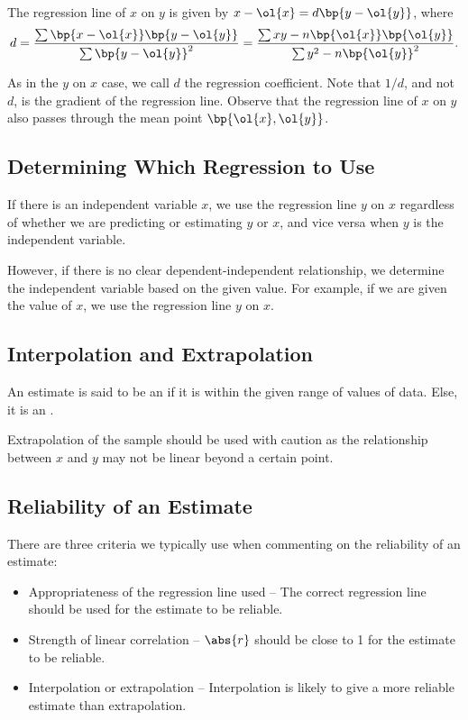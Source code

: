 \begin{problem}
    The regression line of $x$ on $y$ is given by $x - \ol{x} = d\bp{y - \ol{y}}$, where \[d = \frac{\sum \bp{x - \ol{x}} \bp{y - \ol{y}}}{\sum \bp{y - \ol{y}}^2} = \frac{\sum xy - n \bp{\ol{x}}\bp{\ol{y}}}{\sum y^2 - n \bp{\ol{y}}^2}.\]
\end{problem}

As in the $y$ on $x$ case, we call $d$ the regression coefficient. Note that $1/d$, and not $d$, is the gradient of the regression line. Observe that the regression line of $x$ on $y$ also passes through the mean point $\bp{\ol{x}, \ol{y}}$.

\subsection{Determining Which Regression to Use}

If there is an independent variable $x$, we use the regression line $y$ on $x$ regardless of whether we are predicting or estimating $y$ or $x$, and vice versa when $y$ is the independent variable.

However, if there is no clear dependent-independent relationship, we determine the independent variable based on the given value. For example, if we are given the value of $x$, we use the regression line $y$ on $x$.

\subsection{Interpolation and Extrapolation}

\begin{definition}
    An estimate is said to be an  if it is within the given range of values of data. Else, it is an .
\end{definition}

Extrapolation of the sample should be used with caution as the relationship between $x$ and $y$ may not be linear beyond a certain point.

\subsection{Reliability of an Estimate}

There are three criteria we typically use when commenting on the reliability of an estimate:
\begin{itemize}
    \item Appropriateness of the regression line used -- The correct regression line should be used for the estimate to be reliable.
    \item Strength of linear correlation -- $\abs{r}$ should be close to 1 for the estimate to be reliable.
    \item Interpolation or extrapolation -- Interpolation is likely to give a more reliable estimate than extrapolation.
\end{itemize}

